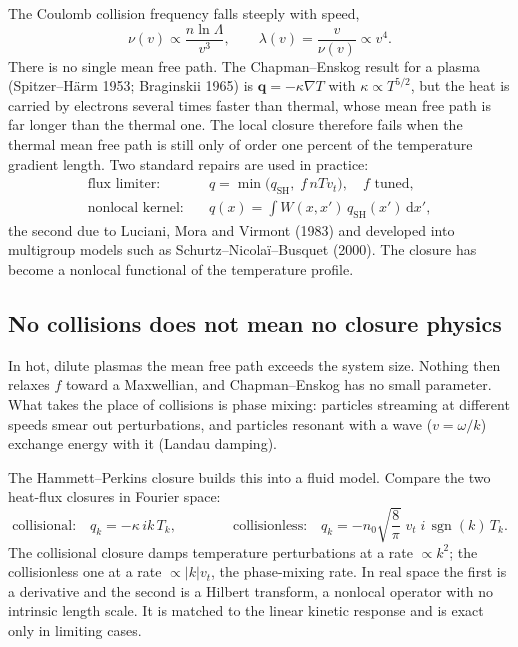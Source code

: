 \documentclass[11pt]{article}
\newcommand{\dd}{\mathrm{d}}
\newcommand{\vt}{v_t}
\newcommand{\sgn}{\operatorname{sgn}}
\newcommand{\bq}{\mathbf{q}}
\begin{document}
The Coulomb collision frequency falls steeply with speed,
\begin{equation}
  \nu(v) \propto \frac{n\ln\Lambda}{v^3},
  \qquad
  \lambda(v) = \frac{v}{\nu(v)} \propto v^4 .
\end{equation}
There is no single mean free path. The Chapman--Enskog result for a plasma
(Spitzer--H\"arm 1953; Braginskii 1965) is $\bq = -\kappa\nabla T$ with
$\kappa \propto T^{5/2}$, but the heat is carried by electrons several times
faster than thermal, whose mean free path is far longer than the thermal one.
The local closure therefore fails when the thermal mean free path is still
only of order one percent of the temperature gradient length. Two standard
repairs are used in practice:
\begin{align}
  \text{flux limiter:}\quad
    & q = \min\bigl(q_{\mathrm{SH}},\; f\,n T \vt\bigr),
      \quad f \text{ tuned}, \\
  \text{nonlocal kernel:}\quad
    & q(x) = \int W(x,x')\,q_{\mathrm{SH}}(x')\,\dd x' ,
\end{align}
the second due to Luciani, Mora and Virmont (1983) and developed into
multigroup models such as Schurtz--Nicola\"i--Busquet (2000). The closure has
become a nonlocal functional of the temperature profile.

\subsection{No collisions does not mean no closure physics}
\label{sec:collisionless}

In hot, dilute plasmas the mean free path exceeds the system size. Nothing
then relaxes $f$ toward a Maxwellian, and Chapman--Enskog has no small
parameter. What takes the place of collisions is phase mixing: particles
streaming at different speeds smear out perturbations, and particles resonant
with a wave ($v = \omega/k$) exchange energy with it (Landau damping).

The Hammett--Perkins closure builds this into a fluid model. Compare the two
heat-flux closures in Fourier space:
\begin{equation}
  \text{collisional:}\quad q_k = -\kappa\,ik\,T_k,
  \qquad\qquad
  \text{collisionless:}\quad
  q_k = -n_0\sqrt{\frac{8}{\pi}}\;\vt\;i\,\sgn(k)\,T_k .
\end{equation}
The collisional closure damps temperature perturbations at a rate
$\propto k^2$; the collisionless one at a rate $\propto |k|\vt$, the
phase-mixing rate. In real space the first is a derivative and the second is
a Hilbert transform, a nonlocal operator with no intrinsic length scale. It
is matched to the linear kinetic response and is exact only in limiting
cases.
\end{document}
